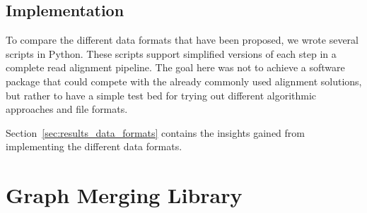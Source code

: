 \documentclass[a4paper,12pt,twoside,BCOR=10mm]{scrbook}
\begin{document}

\subsection{Implementation}
%

To compare the different data formats that have been proposed, 
we wrote several scripts in Python. 
These scripts support simplified versions of each step in a complete read alignment pipeline. 
The goal here was not to achieve a software package that could compete with 
the already commonly used alignment solutions, but rather to have a 
simple test bed for trying out different algorithmic approaches and file formats.

Section~\ref{sec:results_data_formats} contains the insights gained from 
implementing the different data formats.

\section{Graph Merging Library}
%
\end{document}
